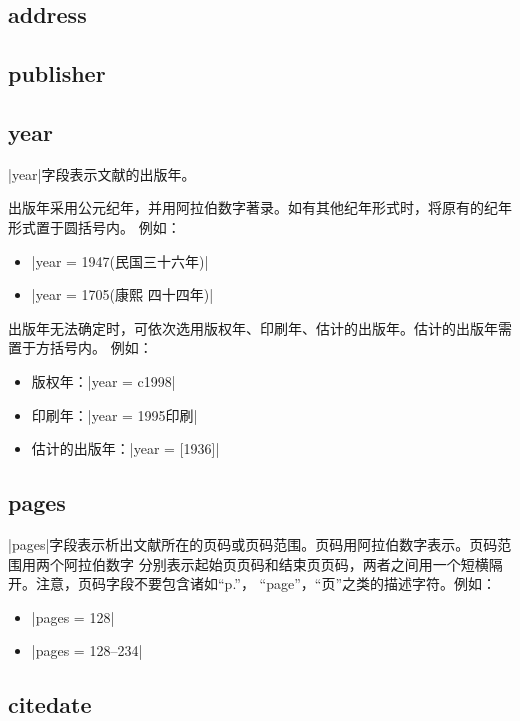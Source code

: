 \subsection{address}\label{subsec:address}

\subsection{publisher}\label{subsec:publisher}

\subsection{year}\label{subsec:year}

|year|字段表示文献的出版年。

出版年采用公元纪年，并用阿拉伯数字著录。如有其他纪年形式时，将原有的纪年形式置于圆括号内。
例如：
\begin{itemize}
\item |year = {1947(民国三十六年)}|
\item |year = {1705(康熙 四十四年)}|
\end{itemize}

出版年无法确定时，可依次选用版权年、印刷年、估计的出版年。估计的出版年需置于方括号内。
例如：
\begin{itemize}
\item 版权年：|year = {c1998}|
\item 印刷年：|year = 1995印刷|
\item 估计的出版年：|year = {[1936]}|
\end{itemize}

\subsection{pages}\label{subsec:pages}

|pages|字段表示析出文献所在的页码或页码范围。页码用阿拉伯数字表示。页码范围用两个阿拉伯数字
分别表示起始页页码和结束页页码，两者之间用一个短横隔开。注意，页码字段不要包含诸如``p.''，
``page''，``页''之类的描述字符。例如：
\begin{itemize}
\item |pages = {128}|
\item |pages = {128--234}|
\end{itemize}

\subsection{citedate}\label{subsec:citedate}


